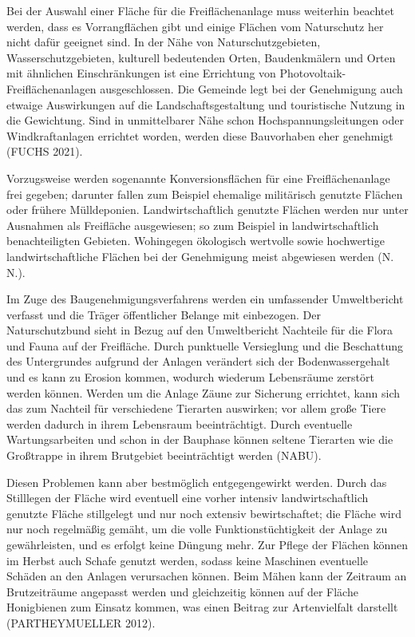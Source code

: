 \documentclass[11pt]{scrartcl}
\begin{document}
Bei der Auswahl einer Fläche für die Freiflächenanlage muss weiterhin beachtet werden, dass es Vorrangflächen gibt und einige Flächen vom Naturschutz her nicht dafür geeignet sind.
In der Nähe von Naturschutzgebieten, Wasserschutzgebieten, kulturell bedeutenden Orten, Baudenkmälern und Orten mit ähnlichen Einschränkungen ist eine Errichtung von Photovoltaik-Freiflächenanlagen ausgeschlossen.
Die Gemeinde legt bei der Genehmigung auch etwaige Auswirkungen auf die Landschaftsgestaltung und touristische Nutzung in die Gewichtung.
Sind in unmittelbarer Nähe schon Hochspannungsleitungen oder Windkraftanlagen errichtet worden, werden diese Bauvorhaben eher genehmigt (FUCHS 2021).

Vorzugsweise werden sogenannte Konversionsflächen für eine Freiflächenanlage frei gegeben; darunter fallen zum Beispiel ehemalige militärisch genutzte Flächen oder frühere Mülldeponien.
Landwirtschaftlich genutzte Flächen werden nur unter Ausnahmen als Freifläche ausgewiesen; so zum Beispiel in landwirtschaftlich benachteiligten Gebieten.
Wohingegen ökologisch wertvolle sowie hochwertige landwirtschaftliche Flächen bei der Genehmigung meist abgewiesen werden (N. N.).
 
Im Zuge des Baugenehmigungsverfahrens werden ein umfassender Umweltbericht verfasst und die Träger öffentlicher Belange mit einbezogen.
Der Naturschutzbund sieht in Bezug auf den Umweltbericht Nachteile für die Flora und Fauna auf der Freifläche.
Durch punktuelle Versieglung und die Beschattung des Untergrundes aufgrund der Anlagen verändert sich der Bodenwassergehalt und es kann zu Erosion kommen, wodurch wiederum Lebensräume zerstört werden können.
Werden um die Anlage Zäune zur Sicherung errichtet, kann sich das zum Nachteil für verschiedene Tierarten auswirken; vor allem große Tiere werden dadurch in ihrem Lebensraum beeinträchtigt.
Durch eventuelle Wartungsarbeiten und schon in der Bauphase können seltene Tierarten wie die Großtrappe in ihrem Brutgebiet beeinträchtigt werden (NABU).
 
Diesen Problemen kann aber bestmöglich entgegengewirkt werden.
Durch das Stilllegen der Fläche wird eventuell eine vorher intensiv landwirtschaftlich genutzte Fläche stillgelegt und nur noch extensiv bewirtschaftet; die Fläche wird nur noch regelmäßig gemäht, um die volle Funktionstüchtigkeit der Anlage zu gewährleisten, und es erfolgt keine Düngung mehr.
Zur Pflege der Flächen können im Herbst auch Schafe genutzt werden, sodass keine Maschinen eventuelle Schäden an den Anlagen verursachen können.
Beim Mähen kann der Zeitraum an Brutzeiträume angepasst werden und gleichzeitig können auf der Fläche Honigbienen zum Einsatz kommen, was einen Beitrag zur Artenvielfalt darstellt (PARTHEYMUELLER 2012).
 
\end{document}
